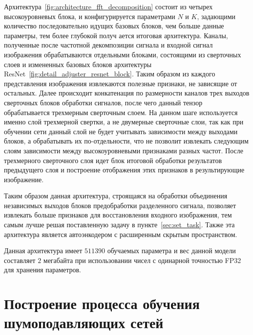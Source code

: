 \documentclass[14pt]{mmcs_article}
\begin{document}
Архитектура~\ref{fig:architecture_fft_decomposition} состоит из четырех высокоуровневых блока, и конфигурируется параметрами $N$ и $K$, задающими количество последовательно идущих базовых блоков, чем больше данные параметры, тем более глубокой получ ается итоговая архитектура. Каналы, полученные после частотной декомпозиции сигнала и входной сигнал изображения обрабатываются отдельными блоками, состоящими из сверточных слоев и измененных базовых блоков архитектуры ResNet~\ref{fig:detail_adjuster_resnet_block}. Таким образом из каждого представления изображения извлекаются полезные признаки, не зависящие от остальных. Далее происходит конкатенация по размерности каналов трех выходов сверточных блоков обработки сигналов, после чего данный тензор обрабатывается трехмерным сверточным слоем. На данном шаге используется именно слой трехмерной свертки, а не двумерные сверточные слои, так как при обучении сети данный слой не будет учитывать зависимости между выходами блоков, а обрабатывать их по-отдельности, что не позволит извлекать следующим слоям зависимости между высокоуровневыми признаками разных частот. После трехмерного сверточного слоя идет блок итоговой обработки результатов предыдущего слоя и построение отображения этих признаков в результирующие изображение. 

Таким образом данная архитектура, строящаяся на обработки объединения независимых выходов блоков предобработки разделенного сигнала, позволяет извлекать больше признаков для восстановления входного изображения, тем самым лучше решая поставленную задачу в пункте~\ref{sec:set_task}. Также эта архитектура является автоэнкодером с расширенным скрытым пространством.

Данная архитектура имеет $511390$ обучаемых параметра и вес данной модели составляет $2$ мегабайта при использовании чисел с одинарной точностью FP32 для хранения параметров.


\section{Построение процесса обучения шумоподавляющих сетей}
\end{document}
